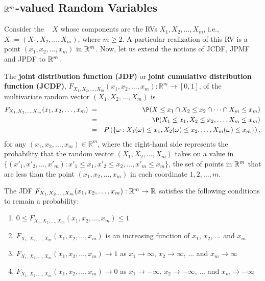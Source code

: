 \subsection{$\mathbb{R}^m$-valued Random Variables}\label{S:Rm-valuedRVs}

Consider the \rv~ $X$ whose components are the RVs $X_1,X_2,\ldots,X_m$, i.e., $X := (X_1,X_2,\ldots,X_m)$, where $m \geq 2$.  
A particular realization of this RV is a point $(x_1,x_2,\ldots,x_m)$ in $\mathbb{R}^m$.  
Now, let us extend the notions of JCDF, JPMF and JPDF to $\mathbb{R}^m$.  

\begin{definition}\label{Df:JmDF}
The {\bf joint distribution function (JDF)} or {\bf joint cumulative distribution function (JCDF)}, $F_{X_1,X_2,\ldots,X_m}(x_1,x_2,\ldots,x_m):\mathbb{R}^m\to [0,1]$, of the multivariate random vector $(X_1,X_2,\ldots,X_m)$ is
\begin{eqnarray}\label{E:jmDF}
F_{X_1,X_2,\ldots,X_m}(x_1,x_2,\ldots,x_m)\; 
&=& \P(X\leq x_1 \cap X_2 \leq x_2 \cap \cdots \cap X_m \leq x_m)\notag\\ 
&=& \P(X_1\leq x_1 , X_2 \leq x_2, \ldots, X_m \leq x_m)\\
&=& P\left( \{ \omega: X_1(\omega) \leq x_1, X_2(\omega) \leq x_2, \ldots, X_m(\omega) \leq x_m \} \right), \notag
\end{eqnarray}
for any $(x_1,x_2,\ldots,x_m) \in \mathbb{R}^m$, 
where the right-hand side represents the probability that the random vector $(X_1,X_2,\ldots,X_m)$ takes on a value in 
$\{(x'_1,x'_2,\ldots,x'_m): x'_1 \leq x_1, x'_2 \leq x_2, \ldots, x'_m \leq x_m\}$, the set of points in $\mathbb{R}^m$ that are less than the point $(x_1,x_2,\ldots,x_m)$ in each coordinate $1,2,\ldots,m$.
\end{definition}

The JDF $F_{X_1,X_2,\ldots,X_m}(x_1,x_2,\ldots,x_m):\mathbb{R}^m\to\mathbb{R}$ satisfies the following conditions to remain a probability: 
\begin{enumerate}
\item $0 \leq F_{X_1,X_2,\ldots,X_m}(x_1,x_2,\ldots,x_m) \leq 1$
\item $F_{X_1,X_2,\ldots,X_m}(x_1,x_2,\ldots,x_m)$ is an increasing function of $x_1$, $x_2$, $\ldots$ and $x_m$
\item $F_{X_1,X_2,\ldots,X_m}(x_1,x_2,\ldots,x_m) \to 1$ as $x_1\to \infty$, $x_2\to \infty$, $\ldots$ and $x_m\to \infty$
\item $F_{X_1,X_2,\ldots,X_m}(x_1,x_2,\ldots,x_m) \to 0$ as $x_1\to -\infty$, $x_2\to -\infty$, $\ldots$ and $x_m\to -\infty$
\end{enumerate}

